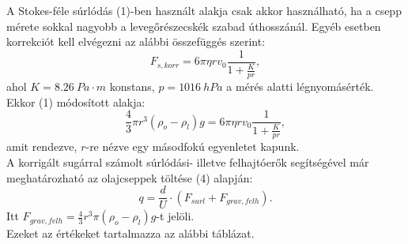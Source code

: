 \documentclass[a4paper]{article}
\begin{document}
A Stokes-féle súrlódás (1)-ben használt alakja csak akkor használható, ha a csepp mérete sokkal nagyobb a levegőrészecskék szabad úthosszánál. Egyéb esetben korrekciót kell elvégezni az alábbi összefüggés szerint:
\begin{equation}
F_{s,korr}=6\pi\eta r v_0\frac{1}{1+\frac{K}{pr}},
\end{equation} 
ahol $K=8.26\ Pa\cdot m$ konstans, $p=1016\ hPa$ a mérés alatti légnyomásérték.\\
Ekkor (1) módosított alakja:
\begin{equation}
\frac{4}{3}\pi r^3(\rho_o-\rho_l)g=6\pi\eta r v_0\frac{1}{1+\frac{K}{pr}},
\end{equation}
amit rendezve, $r$-re nézve egy másodfokú egyenletet kapunk.\\
A korrigált sugárral számolt súrlódási- illetve felhajtóerők segítségével már meghatározható az olajcseppek töltése (4) alapján:
\begin{equation}
q=\frac{d}{U}\cdot(F_{surl}+F_{grav,felh}).
\end{equation}
Itt $F_{grav,felh}=\frac{4}{3}r^3\pi(\rho_o-\rho_l)g$-t jelöli.\\
Ezeket az értékeket tartalmazza az alábbi táblázat.\newpage
\end{document}
